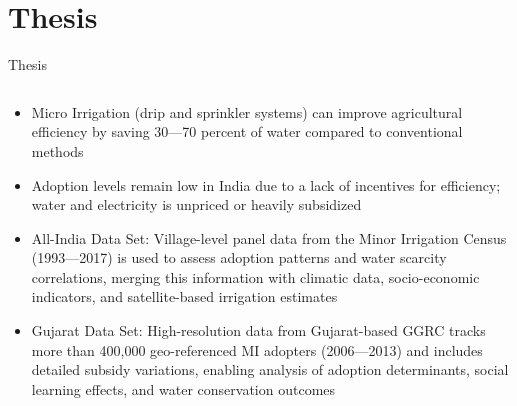 \documentclass[10pt]{beamer}
\begin{document}
\section{Thesis}
\begin{frame}{Thesis}
	\begin{columns}
		\begin{column}{0.7\textwidth}
			\begin{itemize}
				\item Micro Irrigation (drip and sprinkler systems) can improve agricultural efficiency by saving 30—70 percent of water compared to conventional methods
				\item Adoption levels remain low in India due to a lack of incentives for efficiency; water and electricity is unpriced or heavily subsidized
				\item All-India Data Set: Village-level panel data from the Minor Irrigation Census (1993—2017) is used to assess adoption patterns and water scarcity correlations, merging this information with climatic data, socio-economic indicators, and satellite-based irrigation estimates
				\item Gujarat Data Set: High-resolution data from Gujarat-based GGRC tracks more than 400,000 geo-referenced MI adopters (2006—2013) and includes detailed subsidy variations, enabling analysis of adoption determinants, social learning effects, and water conservation outcomes
			\end{itemize}
		\end{column}


\end{columns}
\end{frame}
\end{document}
